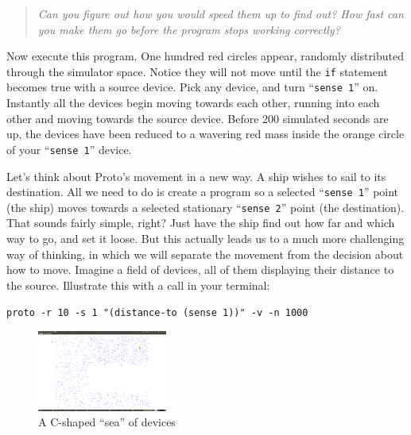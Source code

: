 \documentclass{article}
\newcommand\code[1]{\begin{center}\var{#1}\end{center}}
\newcommand\problem[1]{\begin{quote}{\em #1}\end{quote}}
\newcommand\var[1]{{\tt #1}}
\newcommand\qvar[1]{``{\tt #1}''}
\begin{document}
\problem{Can you figure out how you would speed them up to find out?
  How fast can you make them go before the program stops working
  correctly?}

Now execute this program.  One hundred red circles appear, randomly
distributed through the simulator space.  Notice they will not move
until the \var{if} statement becomes true with a source device.  Pick
any device, and turn \qvar{sense 1} on.  Instantly all the devices
begin moving towards each other, running into each other and moving
towards the source device.  Before 200 simulated seconds are up, the
devices have been reduced to a wavering red mass inside the orange
circle of your \qvar{sense 1} device.

Let's think about Proto's movement in a new way.  A ship wishes to
sail to its destination.  All we need to do is create a program so a
selected \qvar{sense 1} point (the ship) moves towards a selected
stationary \qvar{sense 2} point (the destination).  That sounds fairly
simple, right?  Just have the ship find out how far and which way to
go, and set it loose.  But this actually leads us to a much more
challenging way of thinking, in which we will separate the movement
from the decision about how to move.  Imagine a field of devices, all
of them displaying their distance to the source.  Illustrate this with
a call in your terminal:

\code{proto -r 10 -s 1 "(distance-to (sense 1))" -v -n 1000}

\begin{figure}
  \includegraphics[width=0.38\textwidth]{figures/c-sea.png}
  \caption{A C-shaped ``sea'' of devices}
  \vspace{-0.5cm}
  \label{f:csea}
\end{figure}
\end{document}
